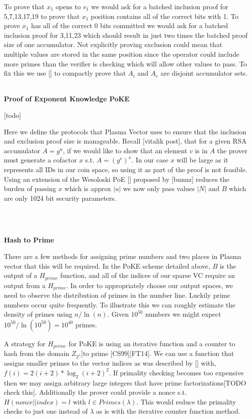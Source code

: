 \documentclass[11pt]{article}
\begin{document}
To prove that $x_1$ opens to $v_1$ we would ask for a batched inclusion proof for 5,7,13,17,19 to prove that $x_1$ position contains all of the correct bits with 1. To prove $x_1$ has all of the correct 0 bits committed we would ask for a batched inclusion proof for 3,11,23 which should result in just two times the batched proof size of one accumulator. Not explicitly proving exclusion could mean that multiple values are stored in the same position since the operator could include more primes than the verifier is checking which will allow other values to pass. To fix this we use [] to compactly prove that $A_i$ and $A_e$ are disjoint accumulator sets.
\\
\\

\centerline{\textbf{Proof of Exponent Knowledge \textbf{PoKE}}}

[todo]

Here we define the protocols that Plasma Vector uses to ensure that the inclusion and exclusion proof size is manageable. Recall [vitalik post], that for a given RSA accumulator $A = g^u$, if we would like to show that an element $v$ is in $A$ the prover must generate a cofactor $x$ s.t. $A = (g^v)^x$. In our case $x$ will be large as it represents all IDs in our coin space, so using it as part of the proof is not feasible. Using an extension of the Wesoloski PoE [] proposed by [bunnz] reduces the burden of passing $x$ which is approx $|u|$ we now only pass values $|N|$ and $B$ which are only 1024 bit security parameters.



\\ 
\\
\centerline{\textbf{Hash to Prime}}

There are a few methods for assigning prime numbers and two places in Plasma vector that this will be required. In the PoKE scheme detailed above, $B$ is the output of a $H_{prime}$ function, and all of the indices of our sparse VC require an output from a $H_{prime}$. In order to appropriately choose our output spaces, we need to observe the distribution of primes in the number line. Luckily prime numbers occur quite frequently. To illustrate this we can roughly estimate the density of primes using $n/\ln(n)$. Given $10^{50}$ numbers we might expect $10^{50}/\ln(10^{50})=10^{40} $ primes.

A strategy for $H_{prime}$ for PoKE is using an iterative function and a counter to hash from the domain $Z_{2^{\lambda}}$]to prime [CS99][FT14]. We can use a function that assigns smaller primes to the vector indices as was described by [] with, $f(i)=2(i+2)* \log_2(i+2)^2$. If primality checking becomes too expensive then we may assign arbitrary large integers that have prime factorizations[TODO check this]. Additionally the prover could provide a nonce s.t. $H(nonce||index)=l$ with $l \in Primes(\lambda)$. This would reduce the primality checks to just one instead of $\lambda$ as is with the iterative counter function method.
\end{document}
